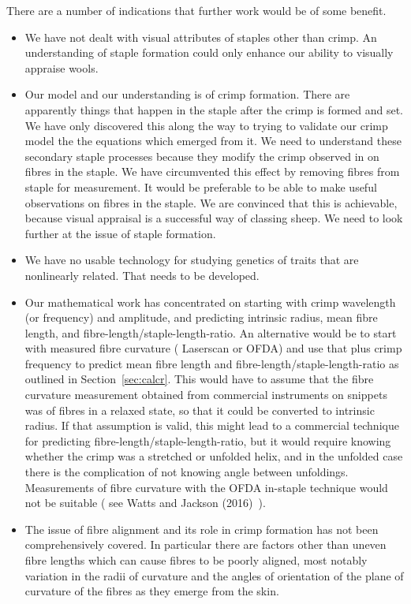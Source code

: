 \documentclass[titlepage,10pt]{article}  %
\begin{document}
There are a number of indications that further work would be of some benefit.
\begin{itemize}
\item We have not dealt with visual attributes of staples other than crimp.  An understanding of staple formation could only enhance our ability to visually appraise wools.
\item Our model and our understanding is of crimp formation. There are apparently things that happen in the staple after the crimp is formed and set. We have only discovered this along the way to trying to validate our crimp model the the equations which emerged from it. We need to understand these secondary staple processes because they modify the crimp observed in on fibres in the staple. We have circumvented this effect by removing fibres from staple for measurement. It would be preferable to be able to make useful observations on fibres in the staple. We are convinced that this is achievable, because visual appraisal is a successful way of classing sheep. We need to look further at the issue of staple formation.
\item We have no usable technology for studying genetics of traits that are nonlinearly related. That needs to be developed.
\item Our mathematical work has concentrated on starting with crimp wavelength (or frequency) and amplitude, and predicting intrinsic radius, mean fibre length, and fibre-length/staple-length-ratio. An alternative would be to start with measured fibre curvature ( Laserscan or OFDA) and use that plus crimp frequency to predict mean fibre length and fibre-length/staple-length-ratio as outlined in Section~\ref{sec:calcr}.  This would have to assume that the fibre curvature measurement obtained from commercial instruments on snippets was of fibres in a relaxed state, so that it could be converted to intrinsic radius. If that assumption is valid, this  might lead to a commercial technique for predicting fibre-length/staple-length-ratio, but it would require knowing whether the crimp was a stretched or unfolded helix, and in the unfolded case there is the complication of not knowing angle between unfoldings. Measurements of fibre curvature with the OFDA in-staple technique would not be suitable ( see Watts and Jackson (2016)~\cite{watt:16}).
\item The issue of fibre alignment and its role in crimp formation has not been comprehensively covered.  In particular there are factors other than uneven fibre lengths which can cause fibres to be poorly aligned, most notably variation in the radii of curvature and the angles of orientation of the plane of curvature of the fibres as they emerge from the skin. 
\end{itemize}
\end{document}
